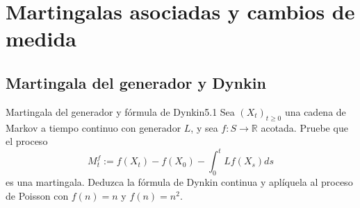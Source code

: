 \documentclass[10pt,a4paper]{article}
\begin{document}
\newpage
\section{Martingalas asociadas y cambios de medida}
\subsection{Martingala del generador y Dynkin}

\begin{ejercicio}{Martingala del generador y fórmula de Dynkin}{5.1}
    Sea $(X_t)_{t\ge 0}$ una cadena de Markov a tiempo continuo con generador $L$, y sea $f: S \to \mathbb{R}$ acotada. Pruebe que el proceso
    \[ M_t^f := f(X_t) - f(X_0) - \int_0^t Lf(X_s) ds \]
    es una martingala. Deduzca la fórmula de Dynkin continua y aplíquela al proceso de Poisson con $f(n)=n$ y $f(n)=n^2$.
\end{ejercicio}
\end{document}

